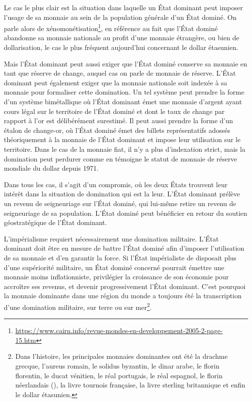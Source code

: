 Le cas le plus clair est la situation dans laquelle un État dominant peut imposer l'usage de sa monnaie au sein de la population générale d'un État dominé. On parle alors de xénomonétisation\footnote{\url{https://www.cairn.info/revue-mondes-en-developpement-2005-2-page-15.htm}}, en référence au fait que l'État dominé abandonne sa monnaie nationale au profit d'une monnaie étrangère, ou bien de dollarisation, le cas le plus fréquent aujourd'hui concernant le dollar étasunien.

Mais l'État dominant peut aussi exiger que l'État dominé conserve sa monnaie en tant que réserve de change, auquel cas on parle de monnaie de réserve. L'État dominant peut également exiger que la monnaie nationale soit indexée à sa monnaie pour formaliser cette domination. Un tel système peut prendre la forme d'un système bimétallique où l'État dominant émet une monnaie d'argent ayant cours légal sur le territoire de l'État dominé et dont le taux de change par rapport à l'or est délibérément surestimé. Il peut aussi prendre la forme d'un étalon de change-or, où l'État dominé émet des billets représentatifs adossés théoriquement à la monnaie de l'État dominant et impose leur utilisation sur le territoire. Dans le cas de la monnaie fiat, il n'y a plus d'indexation strict, mais la domination peut perdurer comme en témoigne le statut de monnaie de réserve mondiale du dollar depuis 1971.

Dans tous les cas, il s'agit d'un compromis, où les deux États trouvent leur intérêt dans la situation de domination qui est la leur. L'État dominant prélève un revenu de seigneuriage sur l'État dominé, qui lui-même retire un revenu de seigneuriage de sa population. L'État dominé peut bénéficier en retour du soutien géostratégique de l'État dominant.

L'impérialisme requiert nécessairement une domination militaire. L'État dominant doit être en mesure de battre l'État dominé afin d'imposer l'utilisation de sa monnaie et d'en garantir la force. Si l'État impérialiste de disposait plus d'une supériorité militaire, un État dominé concerné pourrait émettre une monnaie moins inflationniste, privilégier la croissance de son économie pour accroître ses revenus, et devenir progressivement l'État dominant. C'est pourquoi la monnaie dominante dans une région du monde a toujours été la transcription d'une domination militaire, sur terre ou sur mer\footnote{Dans l'histoire, les principales monnaies dominantes ont été la drachme grecque, l'aureus romain, le solidus byzantin, le dinar arabe, le florin florentin, le ducat vénitien, le réal portugais, le réal espagnol, le florin néerlandais (), la livre tournois française, la livre sterling britannique et enfin le dollar étasunien.}.

